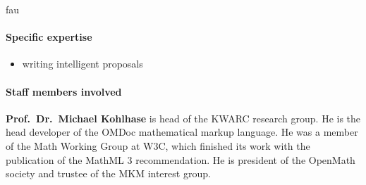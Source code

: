 \begin{sitedescription}{fau}
\paragraph{Specific expertise}

\begin{itemize}
\item writing intelligent proposals
\end{itemize}

\paragraph{Staff members involved}

\textbf{Prof.\ Dr.\ Michael Kohlhase} is head of the KWARC research group.  He is the head
developer of the OMDoc mathematical markup language.  He was a member of the Math Working
Group at W3C, which finished its work with the publication of the MathML 3 recommendation.
He is president of the OpenMath society and trustee of the MKM interest group.

\end{sitedescription}


